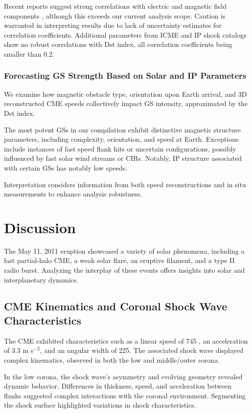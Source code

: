 Recent reports suggest strong correlations with electric and magnetic field components \citep{echer_2022}, although this exceeds our current analysis scope. Caution is warranted in interpreting results due to lack of uncertainty estimates for correlation coefficients. Additional parameters from ICME and IP shock catalogs show no robust correlations with Dst index, all correlation coefficients being smaller than 0.2.

\subsubsection{Forecasting GS Strength Based on Solar and IP Parameters}
We examine how magnetic obstacle type, orientation upon Earth arrival, and 3D reconstructed CME speeds collectively impact GS intensity, approximated by the Dst index.

The most potent GSs in our compilation exhibit distinctive magnetic structure parameters, including complexity, orientation, and speed at Earth. Exceptions include instances of fast speed flank hits or uncertain configurations, possibly influenced by fast solar wind streams or CIRs. Notably, IP structure associated with certain GSs has notably low speeds.

Interpretation considers information from both speed reconstructions and in situ measurements to enhance analysis robustness.

\section{Discussion}
The May 11, 2011 eruption showcased a variety of solar phenomena, including a fast partial-halo CME, a weak solar flare, an eruptive filament, and a type II radio burst. Analyzing the interplay of these events offers insights into solar and interplanetary dynamics.

\subsection{CME Kinematics and Coronal Shock Wave Characteristics}
The CME exhibited characteristics such as a linear speed of 745 \kms, an acceleration of 3.3 m s$^{-2}$, and an angular width of 225\degree. The associated shock wave displayed complex kinematics, observed in both the low and middle/outer corona.

In the low corona, the shock wave's asymmetry and evolving geometry revealed dynamic behavior. Differences in thickness, speed, and acceleration between flanks suggested complex interactions with the coronal environment. Segmenting the shock surface highlighted variations in shock characteristics.

